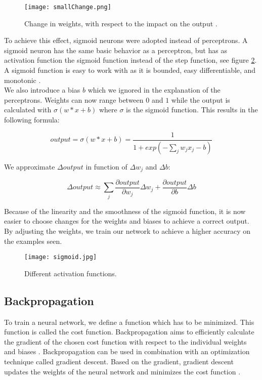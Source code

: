 \begin{figure}[!htb]
	\centering
	\texttt{[image: smallChange.png]}
	\caption{Change in weights, with respect to the impact on the output \cite{NNintro:online}.}
	\label{fig:smallChange}
\end{figure} 

To achieve this effect, sigmoid neurons were adopted instead of perceptrons. A sigmoid neuron has the same basic behavior as a perceptron, but has as activation function the sigmoid function instead of the step function, see figure \ref{fig:sigmoid}. A sigmoid function is easy to work with as it is bounded, easy differentiable, and monotonic \cite{transfer:article}. \\
We also introduce a bias $b$ which we ignored in the explanation of the perceptrons. Weights can now range between $0$ and $1$ while the output is calculated with $\sigma(w*x+b)$ where $\sigma$ is the sigmoid function. This results in the following formula: 

\begin{equation} 
output = \sigma(w*x+b) = \frac{1}{1+exp(-\sum_j w_jx_j-b)}
\end{equation}

\noindent We approximate $\Delta output$ in function of $\Delta w_j$ and $\Delta b$:

\begin{equation} 
\label{eq:costFunction}
\Delta output \approx \sum_j \frac{\partial output}{\partial w_j}\Delta w_j + \frac{\partial output}{\partial b}\Delta b
\end{equation}

\noindent Because of the linearity and the smoothness of the sigmoid function, it is now easier to choose changes for the weights and biases to achieve a correct output. By adjusting the weights, we train our network to achieve a higher accuracy on the examples seen.

\begin{figure}[!htb]
	\centering
	\texttt{[image: sigmoid.jpg]}
	\caption{Different activation functions.}
	\label{fig:sigmoid}
\end{figure} 
		
	\subsection{Backpropagation}
	
To train a neural network, we define a function which has to be minimized. This function is called the cost function. Backpropagation aims to efficiently calculate the gradient of the chosen cost function with respect to the individual weights and biases \cite{bp:article}. Backpropagation can be used in combination with an optimization technique called gradient descent. Based on the gradient, gradient descent updates the weights of the neural network and minimizes the cost function \cite{NNintro:online}.

